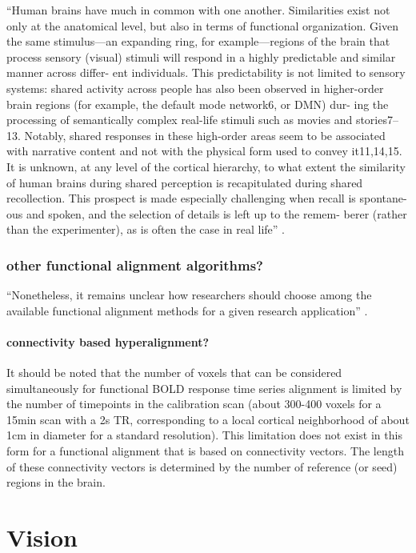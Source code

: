 ``Human brains have much in common with one another. Similarities exist not only
at the anatomical level, but also in terms of functional organization. Given the
same stimulus—an expanding ring, for example—regions of the brain that process
sensory (visual) stimuli will respond in a highly predictable and similar manner
across differ- ent individuals. This predictability is not limited to sensory
systems: shared activity across people has also been observed in higher-order
brain regions (for example, the default mode network6, or DMN) dur- ing the
processing of semantically complex real-life stimuli such as movies and
stories7–13. Notably, shared responses in these high-order areas seem to be
associated with narrative content and not with the physical form used to convey
it11,14,15. It is unknown, at any level of the cortical hierarchy, to what
extent the similarity of human brains during shared perception is recapitulated
during shared recollection. This prospect is made especially challenging when
recall is spontane- ous and spoken, and the selection of details is left up to
the remem- berer (rather than the experimenter), as is often the case in real
life'' \citep{chen2017shared}.


\subsubsection{other functional alignment algorithms?}

``Nonetheless, it remains unclear how researchers should choose among the
available functional alignment methods for a given research application''
\citep{bazeille2021empirical}.

\paragraph{connectivity based hyperalignment?}
%
It should be noted that the number of voxels that can be considered
simultaneously for functional BOLD response time series alignment is limited by
the number of timepoints in the calibration scan (about 300-400 voxels for a
15min scan with a 2s TR, corresponding to a local cortical neighborhood of about
1cm in diameter for a standard resolution).
%
This limitation does not exist in this form for a functional alignment that is
based on connectivity vectors.
%
The length of these connectivity vectors is determined by the number of
reference (or seed) regions in the brain.


\section{Vision}

